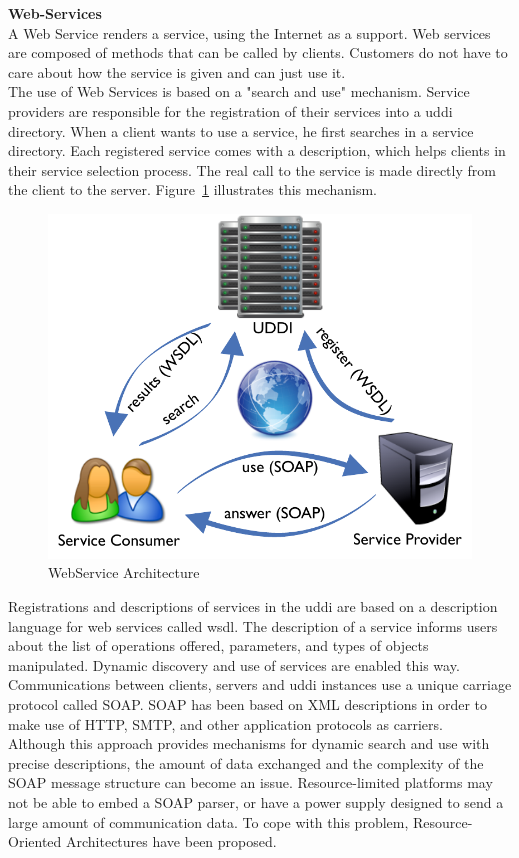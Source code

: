 {\bf Web-Services}\\
A Web Service renders a service, using the Internet as a support. Web services are composed of methods that can be called by clients. Customers do not have to care about how the service is given and can just use it.\\

The use of Web Services is based on a "search and use" mechanism. Service providers are responsible for the registration of their services into a \gls{uddi} directory. When a client wants to use a service, he first searches in a service directory. Each registered service comes with a description, which helps clients in their service selection process. The real call to the service is made directly from the client to the server. Figure~\ref{fig:web-servce-archi} illustrates this mechanism.\\
\begin{figure}
  \centering
  \includegraphics[width=.5\textwidth]{part1/pics/WSArchi.pdf}
  \caption{WebService Architecture}
  \label{fig:web-servce-archi}
\end{figure}

Registrations and descriptions of services in the \gls{uddi} are based on a description language for web services called \gls{wsdl}. The description of a service informs users about the list of operations offered, parameters, and types of objects manipulated. Dynamic discovery and use of services are enabled this way.\\
Communications between clients, servers and \gls{uddi} instances use a unique carriage protocol called SOAP. SOAP has been based on XML descriptions in order to make use of HTTP, SMTP, and other application protocols as carriers.\\

Although this approach provides mechanisms for dynamic search and use with precise descriptions, the amount of data exchanged and the complexity of the SOAP message structure can become an issue. Resource-limited platforms may not be able to embed a SOAP parser, or have a power supply designed to send a large amount of communication data. To cope with this problem, Resource-Oriented Architectures have been proposed.\\


